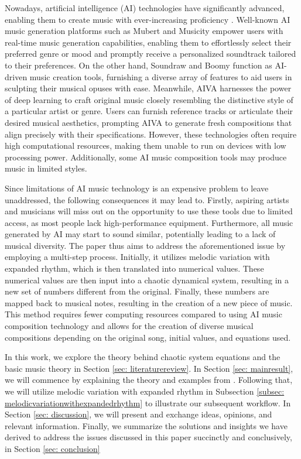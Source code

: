 \documentclass[11pt]{article}
\theoremstyle{definition}
\begin{document}
Nowadays, artificial intelligence (AI) technologies have significantly advanced, enabling them to create music with ever-increasing proficiency \cite{bonnici_music_2021}. 
Well-known AI music generation platforms such as  Mubert \cite{mubert_website} and 
Musicity \cite{musicfy_website} empower users with real-time music generation capabilities, 
enabling them to effortlessly select their preferred genre or mood and promptly receive a personalized soundtrack tailored to their preferences. On the other hand, Soundraw \cite{soundraw_website} and Boomy \cite{boomy_website} function as AI-driven music creation tools, furnishing a diverse array of features to aid users in sculpting their musical opuses with ease. Meanwhile, AIVA \cite{aiva_website} harnesses the power of deep learning to craft original music closely resembling the distinctive style of a particular artist or genre. Users can furnish reference tracks or articulate their desired musical aesthetics, prompting AIVA to generate fresh compositions that align precisely with their specifications. However, these technologies often require high computational resources, making them unable to run on devices with low processing power. Additionally, some AI music composition tools may produce music in limited styles.

Since limitations of AI music technology is an expensive problem to leave unaddressed, the following consequences it may lead to. Firstly, aspiring artists and musicians will miss out on the opportunity to use these tools due to limited access, as most people lack high-performance equipment. Furthermore, all music generated by AI may start to sound similar, potentially leading to a lack of musical diversity. The paper thus aims to address the aforementioned issue by employing a multi-step process. Initially, it utilizes melodic variation with expanded rhythm, which is then translated into numerical values. These numerical values are then input into a chaotic dynamical system, resulting in a new set of numbers different from the original. Finally, these numbers are mapped back to musical notes, resulting in the creation of a new piece of music. This method requires fewer computing resources compared to using AI music composition technology and allows for the creation of diverse musical compositions depending on the original song, initial values, and equations used.

In this work, we explore the theory behind chaotic system equations and the basic music theory in Section \ref{sec: literaturereview}. In Section \ref{sec: mainresult}, we will commence by explaining the theory and examples from \cite{dabby_musical_1996}. Following that, we will utilize melodic variation with expanded rhythm in Subsection \ref{subsec: melodicvariationwithexpandedrhythm} to illustrate our subsequent workflow. In Section \ref{sec: discussion}, we will present and exchange ideas, opinions, and relevant information. Finally,  we summarize the solutions and insights we have derived to address the issues discussed in this paper succinctly and conclusively, in Section \ref{sec: conclusion}
\end{document}
